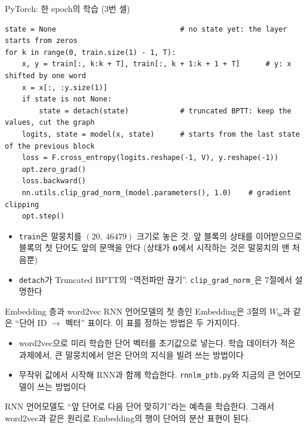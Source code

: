 \documentclass[aspectratio=169,11pt]{beamer}
\begin{document}
\begin{frame}[fragile]{PyTorch: 한 epoch의 학습 (3번 셀)}
\begin{lstlisting}
state = None                             # no state yet: the layer starts from zeros
for k in range(0, train.size(1) - 1, T):
    x, y = train[:, k:k + T], train[:, k + 1:k + 1 + T]      # y: x shifted by one word
    x = x[:, :y.size(1)]
    if state is not None:
        state = detach(state)            # truncated BPTT: keep the values, cut the graph
    logits, state = model(x, state)      # starts from the last state of the previous block
    loss = F.cross_entropy(logits.reshape(-1, V), y.reshape(-1))
    opt.zero_grad()
    loss.backward()
    nn.utils.clip_grad_norm_(model.parameters(), 1.0)    # gradient clipping
    opt.step()
\end{lstlisting}
\begin{itemize}
\item \texttt{train}은 말뭉치를 $(20,\ 46479)$ 크기로 놓은 것.
앞 블록의 상태를 이어받으므로 블록의 첫 단어도 앞의 문맥을 안다
(상태가 $\bm{0}$에서 시작하는 것은 말뭉치의 맨 처음뿐)
\item \texttt{detach}가 Truncated BPTT의 ``역전파만 끊기''.
\texttt{clip\_grad\_norm\_}은 7절에서 설명한다
\end{itemize}
\end{frame}

\begin{frame}{Embedding 층과 word2vec}
RNN 언어모델의 첫 층인 Embedding은 3절의 $W_{\text{in}}$과 같은 ``단어 ID $\to$ 벡터'' 표이다.
이 표를 정하는 방법은 두 가지이다.
\vskip1mm
\begin{itemize}
\item word2vec으로 미리 학습한 단어 벡터를 초기값으로 넣는다.
학습 데이터가 적은 과제에서, 큰 말뭉치에서 얻은 단어의 지식을 빌려 쓰는 방법이다
\item 무작위 값에서 시작해 RNN과 함께 학습한다.
\texttt{rnnlm\_ptb.py}와 지금의 큰 언어모델이 쓰는 방법이다
\end{itemize}
\vskip2mm
\begin{keybox}
RNN 언어모델도 ``앞 단어로 다음 단어 맞히기''라는 예측을 학습한다.
그래서 word2vec과 같은 원리로 Embedding의 행이 단어의 분산 표현이 된다.
\end{keybox}
\end{frame}
\end{document}

